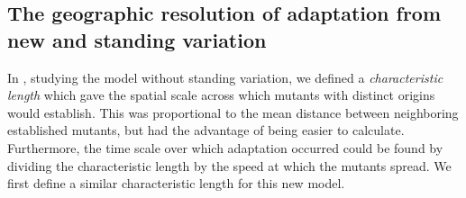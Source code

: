 \documentclass{article}
\begin{document}



\subsection{The geographic resolution of adaptation from new and standing variation}


In \citet{ralphcoop2010}, studying the model without standing variation,
we defined a {\em characteristic length} which gave the spatial scale across which mutants with distinct origins would establish.
This was proportional to the mean distance between neighboring established mutants,
but had the advantage of being easier to calculate.
Furthermore, the time scale over which adaptation occurred could be found by dividing the characteristic length 
by the speed at which the mutants spread.
We first define a similar characteristic length for this new model. %
\end{document}
